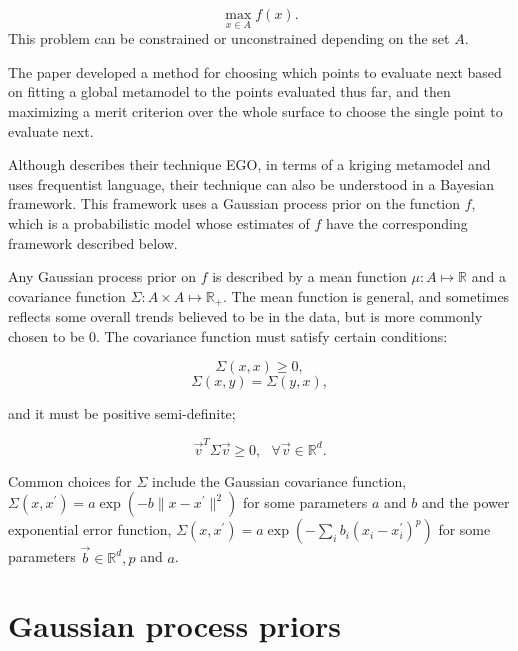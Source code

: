 \documentclass[phd,tocprelim]{cornell}
\begin{document}
\begin{equation}
\max_{x \in A} f(x).
\end{equation}
This problem can be constrained or unconstrained depending on the set $A$.

The paper \cite{Jones1998} developed a method for choosing which points to evaluate next based on fitting a global metamodel to the points evaluated thus far, and then maximizing a merit criterion over the whole surface to choose the single point to evaluate next.

Although \cite{Jones1998} describes their technique EGO, in terms of a kriging metamodel and uses frequentist language, their technique can also be understood in a Bayesian framework. This framework uses a Gaussian process prior on the function $f$, which is a probabilistic model whose estimates of $f$ have the corresponding framework described below.

Any Gaussian process prior on $f$ is described by a mean function $\mu : A \mapsto \mathbb{R}$ and a covariance function $\Sigma : A \times A \mapsto \mathbb{R}_{+}$. The mean function is general, and sometimes reflects some overall trends believed to be in the data, but is more commonly chosen to be 0. The covariance function must satisfy certain conditions: 

\begin{equation}\Sigma(x,x) \geq 0,\end{equation}
\begin{equation}\Sigma(x,y) = \Sigma(y,x),\end{equation}

and it must be positive semi-definite;

\begin{equation}\vec{v}^{T}\Sigma \vec{v} \geq 0, \ \ \ \forall \vec{v} \in \mathbb{R}^{d}.\end{equation}

Common choices for $\Sigma$ include the Gaussian covariance function, $\Sigma(x,x^{\prime}) = a \exp(-b \| x - x^{\prime}\|^{2})$ for some parameters $a$ and $b$ and the power exponential error function, $\Sigma(x, x^{\prime}) = a \exp(-\sum_{i} b_{i} (x_{i} - x_{i}^{\prime})^{p})$ for some parameters $\vec{b} \in \mathbb{R}^{d}, p$ and $a$.

\section{Gaussian process priors}
\end{document}
